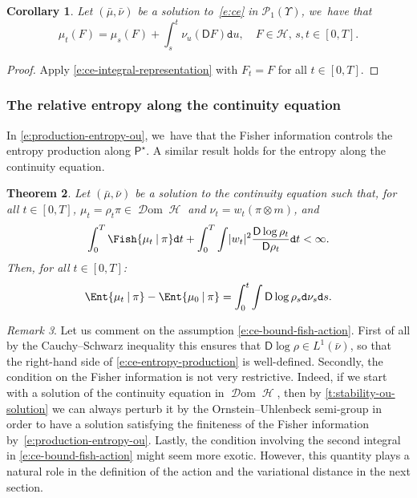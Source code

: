 \documentclass[JEP,XML,SOM,Unicode,published]{cedram}
\newtheorem{theorem}{Theorem}[section]
\newtheorem{corollary}[theorem]{Corollary}
\theoremstyle{definition}
\theoremstyle{remark}
\newtheorem{remark}[theorem]{Remark}
\DeclarePairedDelimiter{\abs}{\lvert}{\rvert}
\newcommand{\given}[1][]{%
\nonscript\:#1\vert
\allowbreak
\nonscript\:
\mathopen{}}
\DeclareMathOperator{\ent}{\mathcal{H}}
\DeclareMathOperator{\dom}{\mathscr{D}om}
\begin{document}
\begin{corollary}\label{t:ce-one-function}
Let $(\bar{\mu}, \bar{\nu})$ be a solution to~\cref{e:ce} in $\mathscr{P}_{1}(\varUpsilon)$, we~have that
\begin{equation}\label{e:ce-integral-representation-G}
\mu_{t}(F) = \mu_{s}(F) + \int_{s}^{t} \nu_{u}(\mathsf{D} F) \mathtt{d} u, \quad F \in \mathscr{H},\, s,t \in [0,T].
\end{equation}
\end{corollary}
\begin{proof}
Apply \cref{e:ce-integral-representation} with $F_{t} = F$ for all $t \in [0,T]$.
\end{proof}

\subsubsection{The relative entropy along the continuity equation}

In \cref{e:production-entropy-ou}, we~have that the Fisher information controls the entropy production along $\mathsf{P}^{\star}$.
A similar result holds for the entropy along the continuity equation.

\begin{theorem}\label{t:ce-entropy-production}
Let $(\bar{\mu}, \bar{\nu})$ be a solution to the continuity equation such that, for all $t \in [0,T]$, $\mu_{t} = \rho_{t} \pi \in \dom \ent$ and $\nu_{t} = w_{t} (\pi \otimes m)$, and
\begin{equation}\label{e:ce-bound-fish-action}
\int_{0}^{T} \Fish{ \mu_{t} \given \pi } \mathtt{d} t + \int_{0}^{T} \int \abs{w_{t}}^{2} \frac{\mathsf{D} \log \rho_{t}}{\mathsf{D} \rho_{t}} \mathtt{d} t < \infty.
\end{equation}
Then, for all $t \in [0,T]$:
\begin{equation}\label{e:ce-entropy-production}
\Ent{\mu_{t} \given \pi} - \Ent{ \mu_{0} \given \pi } = \int_{0}^{t} \int \mathsf{D} \log \rho_{s} \mathtt{d} \nu_{s} \mathtt{d} s.
\end{equation}
\end{theorem}

\begin{remark}
Let us comment on the assumption \cref{e:ce-bound-fish-action}.
First of all by the Cauchy--Schwarz inequality this ensures that $\mathsf{D} \log \rho \in L^{1}(\bar{\nu})$, so that the right-hand side of \cref{e:ce-entropy-production} is well-defined.
Secondly, the condition on the Fisher information is not very restrictive.
Indeed, if we start with a solution of the continuity equation in $\dom \ent$, then by \cref{t:stability-ou-solution} we can always perturb it by the Ornstein--Uhlenbeck semi-group in order to have a solution satisfying the finiteness of the Fisher information by~\cref{e:production-entropy-ou}.
Lastly, the condition involving the second integral in \cref{e:ce-bound-fish-action} might seem more exotic.
However, this quantity plays a natural role in the definition of the action and the variational distance in the next section.
\end{remark}
\end{document}

